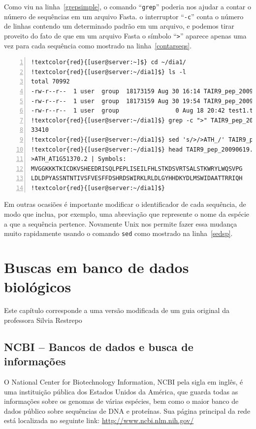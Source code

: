 \documentclass[letter,11pt]{book}
\begin{document}
Como viu na linha~\ref{grepsimple}, o comando ``\Verb+grep+'' poderia nos ajudar a contar o número de sequências em um arquivo Fasta. o interruptor ``\Verb+-c+'' conta o número de linhas contendo um determinado padrão em um arquivo, e podemos tirar proveito do fato de que em um arquivo Fasta o símbolo ``\Verb+>+'' aparece apenas uma vez para cada sequência como mostrado na linha~\ref{contarseqs}.

\begin{Verbatim}[commandchars=!\{\},numbers=left,firstnumber=last,label=Usando comandos Unix com arquivos Fasta,frame=topline,fontsize=\scriptsize]
!textcolor{red}{[user@server:~]$} cd ~/dia1/
!textcolor{red}{[user@server:~/dia1]$} ls -l
total 70992
-rw-r--r--  1 user  group  18173159 Aug 30 16:14 TAIR9_pep_20090619
-rw-r--r--  1 user  group  18173159 Aug 30 19:54 TAIR9_pep_20090619.lc
-rw-r--r--  1 user  group                0 Aug 18 20:42 test1.txt
!textcolor{red}{[user@server:~/dia1]$} grep -c ">" TAIR9_pep_20090619 !label{contarseqs}
33410
!textcolor{red}{[user@server:~/dia1]$} sed 's/>/>ATH_/' TAIR9_pep_20090619 > TAIR9_pep_20090619.mod !label{sedsp}
!textcolor{red}{[user@server:~/dia1]$} head TAIR9_pep_20090619.mod
>ATH_AT1G51370.2 | Symbols: 
MVGGKKKTKICDKVSHEEDRISQLPEPLISEILFHLSTKDSVRTSALSTKWRYLWQSVPG
LDLDPYASSNTNTIVSFVESFFDSHRDSWIRKLRLDLGYHHDKYDLMSWIDAATTRRIQH
!textcolor{red}{[user@server:~/dia1]$}
\end{Verbatim} 

Em outras ocasiões é importante modificar o identificador de cada sequência, de modo que inclua, por exemplo, uma abreviação que represente o nome da espécie a que a sequência pertence. Novamente Unix nos permite fazer essa mudança muito rapidamente usando o comando \Verb+sed+ como mostrado na linha~\ref{sedsp}.

\chapter{Buscas em banco de dados biológicos}

Este capítulo corresponde a uma versão modificada de um guia original da professora Silvia Restrepo

\section{NCBI – Bancos de dados e busca de informações}

O National Center for Biotechnology Information, NCBI pela sigla em inglês, é uma instituição pública dos Estados Unidos da América, que guarda todas as informações sobre os genomas de várias espécies, bem como o maior banco de dados público sobre sequências de DNA e proteínas. Sua página principal da rede está localizada no seguinte link:
\url{http://www.ncbi.nlm.nih.gov/}
\end{document}
